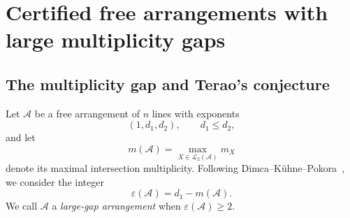 \documentclass[pdflatex,sn-mathphys-num]{sn-jnl}%
\renewcommand{\epsilon}{\varepsilon}
\theoremstyle{remark}
\theoremstyle{definition}
\begin{document}


\section{Certified free arrangements with large multiplicity gaps}
\label{sec:experimental_results}

\subsection{The multiplicity gap and Terao's conjecture}

Let $\mathcal{A}$ be a free arrangement of $n$ lines with exponents
\[
(1,d_1,d_2),
\qquad
d_1\leq d_2,
\]
and let
\[
m(\mathcal{A})
=
\max_{X\in \mathcal{L}_2(\mathcal{A})}m_X
\]
denote its maximal intersection multiplicity. Following Dimca--K\"uhne--Pokora~\cite{Dimca2026freelinearrangementslow}, we consider the integer
\begin{equation}
\label{eq:multiplicity-gap}
\epsilon(\mathcal{A})
=
d_1-m(\mathcal{A}).
\end{equation}
We call $\mathcal{A}$ a \emph{large-gap arrangement} when
$\epsilon(\mathcal{A})\geq2$.
\end{document}
